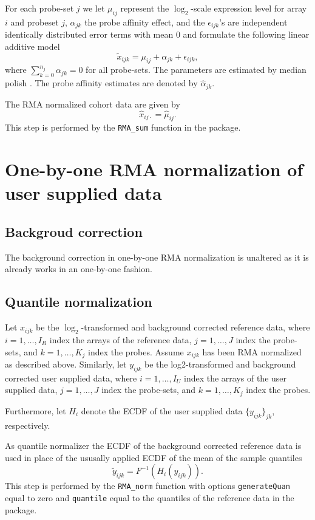 \documentclass{article}
\begin{document}
For each probe-set $j$ we let $\mu_{ij}$ represent the $\log_2$-scale expression level for array $i$ and probeset $j$, $\alpha_{jk}$ the probe affinity effect, and the $\epsilon_{ijk}$'s are independent identically distributed  error terms with mean 0 and formulate the following linear additive model
\begin{equation*}
   \tilde{x}_{ijk} = \mu_{ij} + \alpha_{jk}+ \epsilon_{ijk},
\end{equation*}
where $\sum_{k=0}^{n_j} \alpha_{jk} = 0$ for all probe-sets. The parameters are estimated by median polish \citep{Holder2001}. The probe affinity estimates are denoted by $\hat{\alpha}_{jk}$.

The RMA normalized cohort data are given by
\begin{equation*}
   \hat{x}_{ij\cdot} = \hat{\mu}_{ij}.
\end{equation*}
This step is performed by the \texttt{RMA\_sum} function in the \hemaClass{} package.

\section{One-by-one RMA normalization of user supplied data}
\subsection{Backgroud correction}
The background correction in one-by-one RMA normalization is unaltered as it is already works in an one-by-one fashion.



\subsection{Quantile normalization}

Let $x_{ijk}$ be the $\log_2$-transformed and background corrected reference data, where $i = 1,\dots,I_R$ index the arrays of the reference data, $j=1,\dots,J$  index the probe-sets, and $k=1,\dots,K_j$ index the probes. Assume $x_{ijk}$ has been RMA normalized as described above. Similarly,  let $y_{ijk}$ be the log2-transformed and background corrected user supplied data, where $i = 1,\dots,I_U$ index the arrays of the user supplied data, $j=1,\dots,J$  index the probe-sets, and $k=1,\dots,K_j$ index the probes.

Furthermore, let $H_i$ denote the ECDF of the user supplied data $\{y_{ijk}\}_{jk}$, respectively.

As quantile normalizer the ECDF of the background corrected reference data is used in place of the ususally applied ECDF of the mean of the sample quantiles
\begin{equation*}
   \tilde{y}_{ijk} = F^{-1}(H_i(y_{ijk})).
\end{equation*}
This step is performed by the \texttt{RMA\_norm} function with options \texttt{generateQuan} equal to zero and \texttt{quantile} equal to the quantiles of the reference data in the \hemaClass{} package.
\end{document}
